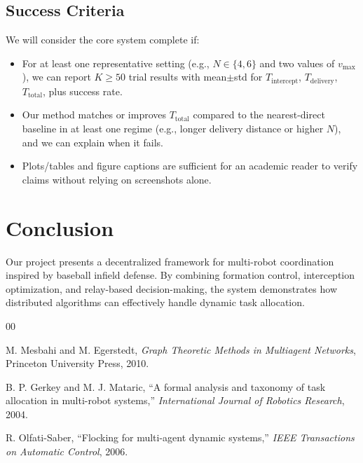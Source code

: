 \documentclass[conference]{IEEEtran}
\begin{document}
\subsection{Success Criteria}
We will consider the core system complete if:
\begin{itemize}
    \item For at least one representative setting (e.g., \(N \in \{4,6\}\) and two values of \(v_{\max}\)), we can report \(K \ge 50\) trial results with mean\(\pm\)std for \(T_{\mathrm{intercept}}\), \(T_{\mathrm{delivery}}\), \(T_{\mathrm{total}}\), plus success rate.
    \item Our method matches or improves \(T_{\mathrm{total}}\) compared to the nearest-direct baseline in at least one regime (e.g., longer delivery distance or higher \(N\)), and we can explain when it fails.
    \item Plots/tables and figure captions are sufficient for an academic reader to verify claims without relying on screenshots alone.
\end{itemize}

\section{Conclusion}

Our project presents a decentralized framework for multi-robot coordination inspired by baseball infield defense. By combining formation control, interception optimization, and relay-based decision-making, the system demonstrates how distributed algorithms can effectively handle dynamic task allocation.

\begin{thebibliography}{00}

 M. Mesbahi and M. Egerstedt, \textit{Graph Theoretic Methods in Multiagent Networks}, Princeton University Press, 2010.

 B. P. Gerkey and M. J. Mataric, ``A formal analysis and taxonomy of task allocation in multi-robot systems,'' \textit{International Journal of Robotics Research}, 2004.

 R. Olfati-Saber, ``Flocking for multi-agent dynamic systems,'' \textit{IEEE Transactions on Automatic Control}, 2006.

\end{thebibliography}
\end{document}
